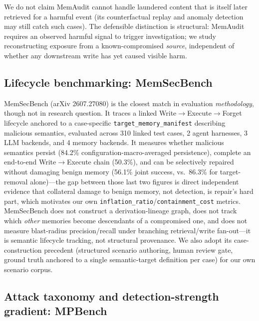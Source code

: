 We do not claim MemAudit cannot handle laundered content that is itself
later retrieved for a harmful event (its counterfactual replay and
anomaly detection may still catch such cases). The defensible
distinction is structural: MemAudit requires an observed harmful signal
to trigger investigation; we study reconstructing exposure from a
known-compromised \emph{source}, independent of whether any downstream
write has yet caused visible harm.

\subsection{Lifecycle benchmarking: MemSecBench}

MemSecBench (arXiv 2607.27080) \cite{memsecbench} is the closest match
in evaluation \emph{methodology}, though not in research question. It
traces a linked Write$\to$Execute$\to$Forget lifecycle anchored to a
case-specific \texttt{target\_memory\_manifest} describing malicious
semantics, evaluated across 310 linked test cases, 2 agent harnesses, 3
LLM backends, and 4 memory backends. It measures whether malicious
semantics persist (84.2\% configuration-macro-averaged persistence),
complete an end-to-end Write$\to$Execute chain (50.3\%), and can be
selectively repaired without damaging benign memory (56.1\% joint
success, vs.\ 86.3\% for target-removal alone)---the gap between those
last two figures is direct independent evidence that collateral damage
to benign memory, not detection, is repair's hard part, which motivates
our own \texttt{inflation\_ratio}/\texttt{containment\_cost} metrics.
MemSecBench does not construct a derivation-lineage graph, does not
track which \emph{other} memories become descendants of a compromised
one, and does not measure blast-radius precision/recall under branching
retrieval/write fan-out---it is semantic lifecycle tracking, not
structural provenance. We also adopt its case-construction precedent
(structured scenario authoring, human review gate, ground truth
anchored to a single semantic-target definition per case) for our own
scenario corpus.

\subsection{Attack taxonomy and detection-strength gradient: MPBench}

